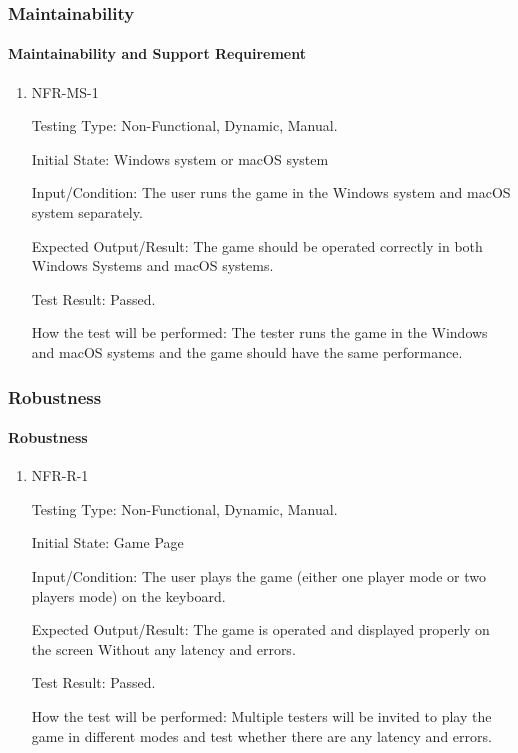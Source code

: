 \documentclass[12pt, titlepage]{article}
\begin{document}
\subsubsection{Maintainability}
\paragraph{Maintainability and Support Requirement}

\begin{enumerate}

\item{NFR-MS-1\\}

Testing Type: Non-Functional, Dynamic, Manual.  

Initial State: Windows system or macOS system

Input/Condition: The user runs the game in the Windows system and macOS system separately.

Expected Output/Result: The game should be operated correctly in both Windows Systems and macOS systems.

Test Result: Passed.

How the test will be performed: The tester runs the game in the Windows and macOS systems and the game should have the same performance.

					

\end{enumerate}


\subsubsection{Robustness}
\paragraph{Robustness}

\begin{enumerate}

\item{NFR-R-1\\}

Testing Type: Non-Functional, Dynamic, Manual.  

Initial State: Game Page

Input/Condition: The user plays the game (either one player mode or two players mode) on the keyboard.

Expected Output/Result: The game is operated and displayed properly on the screen Without any latency and errors.

Test Result: Passed.

How the test will be performed: Multiple testers will be invited to play the game in different modes and test whether there are any latency and errors.

\end{enumerate}
\end{document}
